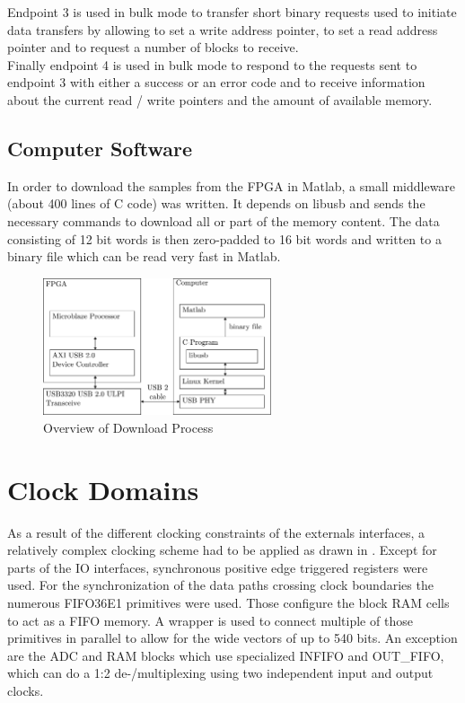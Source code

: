 Endpoint 3 is used in bulk mode to transfer short binary requests used to
initiate data transfers by allowing to set a write address pointer,
to set a read address pointer and to request a number of blocks to receive. \\

Finally endpoint 4 is used in bulk mode to respond to the requests sent
to endpoint 3 with either a success or an error code and to receive information
about the current read / write pointers and the amount of available memory. \\

\subsection{Computer Software}
In order to download the samples from the \gls{FPGA} in Matlab, a small
middleware (about 400 lines of C code) was written.
It depends on libusb and sends the necessary commands
to download all or part of the memory content.
The data consisting of 12 bit words is then zero-padded to 16 bit words
and written to a binary file which can be read very fast in Matlab. \\

\begin{figure}[ht]
  \centering
  \includegraphics[width=0.6\textwidth]{figures/fpga_download}
  \caption{Overview of Download Process}
  \label{fig:fpga_download}
\end{figure}

\section{Clock Domains}
\label{sec:fpga_clocks}

As a result of the different clocking constraints of the externals interfaces,
a relatively complex clocking scheme had to be applied as drawn in
. Except for parts of the \gls{IO} interfaces,
synchronous positive edge triggered registers were used. For the synchronization
of the data paths crossing clock boundaries the numerous FIFO36E1 primitives
were used. Those configure the block \gls{RAM} cells to act as a \gls{FIFO}
memory. A wrapper is used to connect multiple of those primitives 
in parallel to allow for the wide vectors of up to 540 bits.
An exception are the \gls{ADC} and \gls{RAM} blocks which use
specialized \gls{INFIFO} and OUT\_FIFO, which can do a 1:2 de-/multiplexing
using two independent input and output clocks. \\

